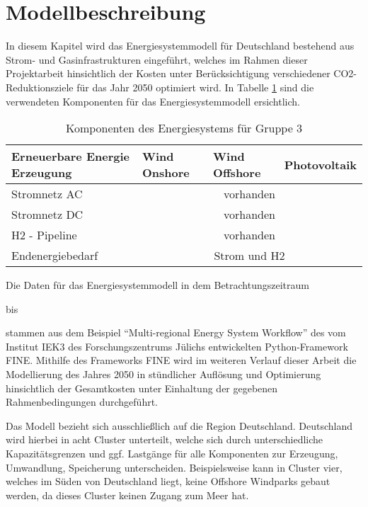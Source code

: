 \section{Modellbeschreibung}
In diesem Kapitel wird das Energiesystemmodell für Deutschland bestehend aus Strom- und Gasinfrastrukturen eingeführt, welches im Rahmen dieser Projektarbeit hinsichtlich der Kosten unter Berücksichtigung verschiedener CO2-Reduktionsziele für das Jahr 2050 optimiert wird. In Tabelle \ref{tab:systemdesign2} sind die verwendeten Komponenten für das Energiesystemmodell ersichtlich.

\begin{table}[ht!]
    \begin{tabular}{|lcll|}
        \hline
        \multicolumn{1}{|l|}{Erneuerbare Energie Erzeugung} & \multicolumn{1}{l|}{Wind Onshore} & \multicolumn{1}{l|}{Wind Offshore} & Photovoltaik \\ \hline
        \multicolumn{1}{|l|}{Stromnetz AC}     & \multicolumn{3}{c|}{vorhanden}                \\ \hline
        \multicolumn{1}{|l|}{Stromnetz DC}     & \multicolumn{3}{c|}{vorhanden}                \\ \hline
        \multicolumn{1}{|l|}{H2 - Pipeline}    & \multicolumn{3}{c|}{vorhanden}                \\ \hline
        \multicolumn{1}{|l|}{Endenergiebedarf} & \multicolumn{3}{c|}{Strom und H2} \\ \hline
    \end{tabular}
    \caption{Komponenten des Energiesystems für Gruppe 3}
    \label{tab:systemdesign2}
\end{table}

Die Daten für das Energiesystemmodell in dem Betrachtungszeitraum \date{01.01.2050} bis \date{31.12.2050} stammen aus dem Beispiel ``Multi-regional Energy System Workflow'' des vom Institut IEK3 des Forschungszentrums Jülichs entwickelten Python-Framework FINE. 
Mithilfe des Frameworks FINE wird im weiteren Verlauf dieser Arbeit die Modellierung des Jahres 2050 in stündlicher Auflösung und Optimierung hinsichtlich der Gesamtkosten unter Einhaltung der gegebenen Rahmenbedingungen durchgeführt.

Das Modell bezieht sich ausschließlich auf die Region Deutschland.  Deutschland wird hierbei in acht Cluster unterteilt, welche sich durch unterschiedliche Kapazitätsgrenzen und ggf. Lastgänge für alle Komponenten zur Erzeugung, Umwandlung, Speicherung unterscheiden. Beispielsweise kann in Cluster vier, welches im Süden von Deutschland liegt, keine Offshore Windparks gebaut werden, da dieses Cluster keinen Zugang zum Meer hat. 


